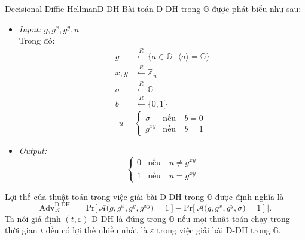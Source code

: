 \documentclass[class=report, crop=false]{standalone}
\begin{document}
			\begin{problem}{Decisional Diffie-Hellman}{D-DH}
				Bài toán D-DH trong $\mathbb{G}$ được phát biểu như sau:
				\vspace{-\baselineskip}
				\begin{itemize}[leftmargin=1.5cm, itemindent=-0.5cm]
					\item[] \textit{Input:} $g, g^x, g^y, u$ \\
					Trong đó: \vspace{-\baselineskip}
					\begin{align*}
						g 		&\xleftarrow{R} \{ a \in \mathbb{G}\ | \ \langle a \rangle = \mathbb{G} \} 	\\
						x, y 	&\xleftarrow{R} \mathbb{Z}_n 												\\
						\sigma 	&\xleftarrow{R} \mathbb{G}													\\
						b 		&\xleftarrow{R} \{ 0, 1 \}
					\end{align*}
					\[
						u = \begin{cases}
							\sigma 	&\text{nếu}\quad b = 0 \\
							g^{xy} 	&\text{nếu}\quad b = 1
						\end{cases}
					\]
					\item[] \textit{Output:}
					\[
						\begin{cases}
							0 &\text{nếu}\quad u \neq g^{xy} \\
							1 &\text{nếu}\quad u = g^{xy}
						\end{cases}
					\]
				\end{itemize}
				\vspace{-\baselineskip}\par
				Lợi thế của thuật toán \algo trong việc giải bài D-DH trong $\mathbb{G}$ được định nghĩa là
				\[
					\text{Adv}_{\mathcal{A}}^{\text{D-DH}} = \Bigg|\ \text{Pr}\bigg[ \ \mathcal{A}\Big(g, g^x, g^y, g^{xy} \Big) = 1 \ \bigg] - \text{Pr}\bigg[ \ \mathcal{A}\Big(g, g^x, g^y, \sigma \Big) = 1 \ \bigg]\ \Bigg|.
				\] \indent
				Ta nói giả định $(t, \varepsilon)$-D-DH là đúng trong $\mathbb{G}$ nếu mọi thuật toán chạy trong thời gian $t$ đều có lợi thế nhiều nhất là $\varepsilon$ trong việc giải bài D-DH trong $\mathbb{G}$.
			\end{problem}
\end{document}
